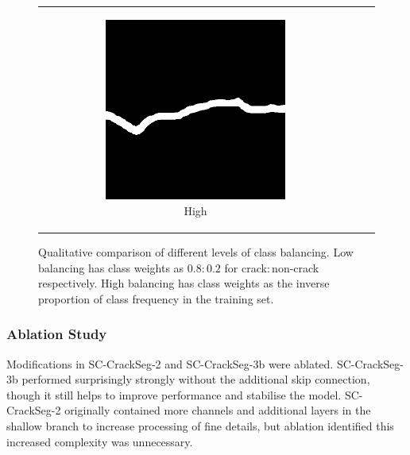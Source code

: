 \documentclass[a4paper,12pt]{report}
\begin{document}
\begin{figure}[htbp]
\begin{tabular}{ccc}
\begin{subfigure}[b]{0.3\textwidth}
        \end{subfigure}
        \begin{subfigure}[b]{0.3\textwidth}
            \centering
            \includegraphics[width=0.75\textwidth]{res/class-balancing-comparison/sc-crackseg-high}
            \caption{High}
            \label{fig:fig:crackseg-class-balancing-high}
        \end{subfigure}
    \end{tabular}
    \caption{Qualitative comparison of different levels of class balancing. Low balancing has class weights as $0.8:0.2$ for crack$:$non-crack respectively. High balancing has class weights as the inverse proportion of class frequency in the training set.}
\end{figure}

\subsubsection*{Ablation Study}

Modifications in SC-CrackSeg-2 and SC-CrackSeg-3b were ablated. SC-CrackSeg-3b performed surprisingly strongly without the additional skip connection, though it still helps to improve performance and stabilise the model. SC-CrackSeg-2 originally contained more channels and additional layers in the shallow branch to increase processing of fine details, but ablation identified this increased complexity was unnecessary.
\end{document}
